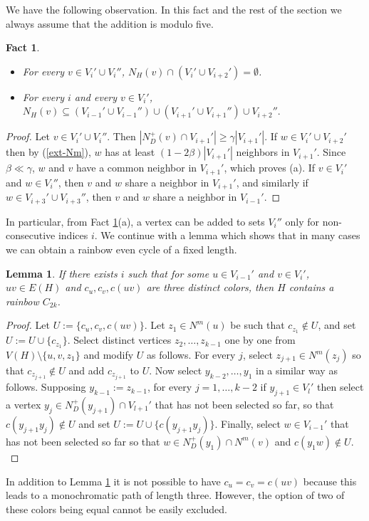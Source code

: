 \documentclass{article}
\newtheorem{fact}[theorem]{Fact}
\newtheorem{lemma}[theorem]{Lemma}
\begin{document}
 We have the following observation. In this fact and the rest of the section we always assume that the addition is modulo five.
 \begin{fact}\label{ext-fact2}
 \begin{itemize}
\item[(a)]     For every $v\in V_i'\cup V_{i}''$, $N_H(v)\cap( V_{i}'\cup V_{i+2}')=\emptyset$. 
\item[(b)] For every $i$ and every $v\in V_i'$, $N_H(v)\subseteq (V_{i-1}'\cup V_{i-1}'') \cup (V_{i+1}'\cup V_{i+1}'')\cup V_{i+2}''.$
\end{itemize}
 \end{fact}
 \begin{proof}
Let $v\in V_i'\cup V_i''$. Then $|N_D^+(v)\cap V_{i+1}'|\geq \gamma |V_{i+1}'|$. If $w\in V_i'\cup V_{i+2}'$ then by (\ref{ext-Nm}), $w$ has at least $(1-2\beta)|V_{i+1}'|$ neighbors in $V_{i+1}'$. Since $\beta\ll \gamma $, $w$ and $v$ have a common neighbor in $V_{i+1}'$, which proves (a). If $v\in V_i'$ and $w\in V_i''$, then $v$ and $w$ share a neighbor in $V_{i+1}'$, and similarly if $w\in V_{i+3}'\cup V_{i+3}''$, then $v$ and $w$ share a neighbor in $V_{i-1}'$. 
 \end{proof}
 In particular, from Fact \ref{ext-fact2}(a), a vertex can be added to sets $V_i''$ only for non-consecutive indices $i$. We continue with a lemma which shows that in many cases we can obtain a rainbow even cycle of a fixed length.
 
 \begin{lemma}\label{ext-lem2}
    If there exists $i$ such that for some $u\in V_{i-1}'$ and $v\in V_i'$, $uv\in E(H)$ and $c_u, c_v, c(uv)$ are three distinct colors, then $H$ contains a rainbow  $C_{2k}$.
 \end{lemma}
 \begin{proof}
 Let $U:= \{c_u, c_v, c(uv)\}$. Let $z_1\in N^m(u)$ be such that $c_{z_1}\notin U$, and set $U:= U \cup \{c_{z_1}\}$. Select distinct vertices $z_2, \dots, z_{k-1}$ one by one from $V(H)\setminus \{u, v, z_1\}$ and modify $U$ as follows. For every $j$, select $z_{j+1}\in N^m(z_j)$ so that $c_{z_{j+1}}\notin U$ and add $c_{z_{j+1}}$ to $U$. Now select $y_{k-2}, \dots, y_1$ in a similar way as follows. Supposing  $y_{k-1}:=z_{k-1}$, for every $j=1, \dots, k-2$ if $y_{j+1}\in V_{l}'$ then select
a vertex $y_{j}\in N^+_D(y_{j+1})\cap V_{l+1}'$ that has not been selected so far, so that $c(y_{j+1}y_j)\notin U$ and set $U:=U\cup \{c(y_{j+1}y_j)\}$. Finally, select $w\in V_{i-1}'$ that has not been selected so far so that $w\in N^+_D(y_{1})\cap N^m(v)$ and $c(y_1w)\notin U.$
 \end{proof}
 In addition to  Lemma \ref{ext-lem2} it is not possible to have $c_u=c_v=c(uv)$ because this leads to a monochromatic path of length three. However, the option of two of these colors being equal cannot be easily excluded. 
\end{document}
